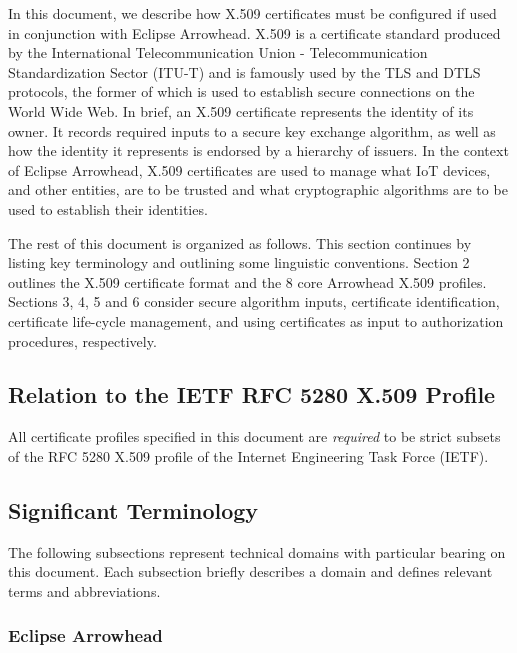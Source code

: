 %
%

In this document, we describe how X.509 certificates must be configured if used in conjunction with Eclipse Arrowhead.
X.509 is a certificate standard produced by the International Telecommunication Union - Telecommunication Standardization Sector (ITU-T) and is famously used by the TLS and DTLS protocols, the former of which is used to establish secure connections on the World Wide Web.
In brief, an X.509 certificate represents the identity of its owner.
It records required inputs to a secure key exchange algorithm, as well as how the identity it represents is endorsed by a hierarchy of issuers.
In the context of Eclipse Arrowhead, X.509 certificates are used to manage what IoT devices, and other entities, are to be trusted and what cryptographic algorithms are to be used to establish their identities.

The rest of this document is organized as follows.
This section continues by listing key terminology and outlining some linguistic conventions.
Section 2 outlines the X.509 certificate format and the 8 core Arrowhead X.509 profiles.
Sections 3, 4, 5 and 6 consider secure algorithm inputs, certificate identification, certificate life-cycle management, and using certificates as input to authorization procedures, respectively.

\subsection{Relation to the IETF RFC 5280 X.509 Profile}

All certificate profiles specified in this document are \textit{required} to be strict subsets of the RFC 5280 X.509 profile of the Internet Engineering Task Force (IETF).

\subsection{Significant Terminology}

The following subsections represent technical domains with particular bearing on this document.
Each subsection briefly describes a domain and defines relevant terms and abbreviations.

\subsubsection{Eclipse Arrowhead}

